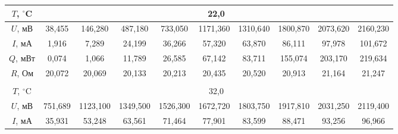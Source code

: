 \documentclass[a4paper, 12pt]{article}
\begin{document}
        \begin{table}[H]
            \centering
            \begin{tabular}{|cccccccccc|}
                \hline
                \multicolumn{1}{|c|}{$T$, $^\circ$C} & \multicolumn{9}{c|}{22,0} \\ \hline
                \multicolumn{1}{|c|}{$U$, мВ} & \multicolumn{1}{c|}{38,455}  & \multicolumn{1}{c|}{146,280}  & \multicolumn{1}{c|}{487,180}  & \multicolumn{1}{c|}{733,050} & \multicolumn{1}{c|}{1171,360} & \multicolumn{1}{c|}{1310,640} & \multicolumn{1}{c|}{1800,870} & \multicolumn{1}{c|}{2073,620} & \multicolumn{1}{c|}{2160,230} \\ \hline
                \multicolumn{1}{|c|}{$I$, мА} & \multicolumn{1}{c|}{1,916}   & \multicolumn{1}{c|}{7,289} & \multicolumn{1}{c|}{24,199}   & \multicolumn{1}{c|}{36,266} & \multicolumn{1}{c|}{57,320}   & \multicolumn{1}{c|}{63,870} & \multicolumn{1}{c|}{86,111}   & \multicolumn{1}{c|}{97,978} & \multicolumn{1}{c|}{101,672} \\ \hline
                \multicolumn{1}{|c|}{$Q$, мВт} & \multicolumn{1}{c|}{0,074} & \multicolumn{1}{c|}{1,066} & \multicolumn{1}{c|}{11,789} & \multicolumn{1}{c|}{26,585} & \multicolumn{1}{c|}{67,142} & \multicolumn{1}{c|}{83,711} & \multicolumn{1}{c|}{155,074} & \multicolumn{1}{c|}{203,170} & \multicolumn{1}{c|}{219,634} \\ \hline
                \multicolumn{1}{|c|}{$R$, Ом} & \multicolumn{1}{c|}{20,072}  & \multicolumn{1}{c|}{20,069}   & \multicolumn{1}{c|}{20,133}   & \multicolumn{1}{c|}{20,213}   & \multicolumn{1}{c|}{20,435}   & \multicolumn{1}{c|}{20,520}   & \multicolumn{1}{c|}{20,913}   & \multicolumn{1}{c|}{21,164} & \multicolumn{1}{c|}{21,247} \\ \hline
                \multicolumn{10}{|c|}{} \\ \hline
                \multicolumn{1}{|c|}{$T$, $^\circ$C} & \multicolumn{9}{c|}{32,0} \\ \hline
                \multicolumn{1}{|c|}{$U$, мВ} & \multicolumn{1}{c|}{751,689} & \multicolumn{1}{c|}{1123,100} & \multicolumn{1}{c|}{1349,500} & \multicolumn{1}{c|}{1526,300} & \multicolumn{1}{c|}{1672,720} & \multicolumn{1}{c|}{1803,750} & \multicolumn{1}{c|}{1917,810} & \multicolumn{1}{c|}{2031,250} & \multicolumn{1}{c|}{2119,400} \\ \hline
                \multicolumn{1}{|c|}{$I$, мА} & \multicolumn{1}{c|}{35,931}  & \multicolumn{1}{c|}{53,248}   & \multicolumn{1}{c|}{63,561}   & \multicolumn{1}{c|}{71,464}   & \multicolumn{1}{c|}{77,901}   & \multicolumn{1}{c|}{83,599}   & \multicolumn{1}{c|}{88,471}   & \multicolumn{1}{c|}{93,256} & \multicolumn{1}{c|}{96,966}   \\ \hline

\end{tabular}
\end{table}
\end{document}
